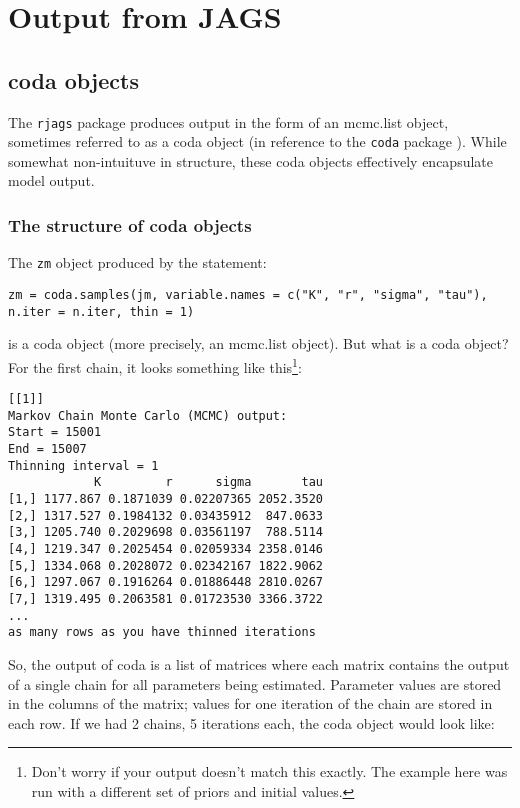 \documentclass[12pt,english]{article}
\begin{document}
\section{Output from JAGS}

\subsection{coda objects}

The \texttt{rjags} package produces output in the form of an mcmc.list object, sometimes referred to as a coda object (in reference to the \texttt{coda} package \citep{Plummer2016coda}). While somewhat non-intuituve in structure, these coda objects effectively encapsulate model output. 



\subsubsection{The structure of coda objects}

The \texttt{zm} object produced by the statement:

\begin{Verbatim}
zm = coda.samples(jm, variable.names = c("K", "r", "sigma", "tau"), 
n.iter = n.iter, thin = 1)
\end{Verbatim}

\noindent is a coda object (more precisely, an mcmc.list object). But what is a coda object? For the first chain, it looks something like this\footnote{Don't worry if your output doesn't match this exactly. The example here was run with a different set of priors and initial values.}:

\begin{Verbatim}[fontsize=\small]
[[1]]
Markov Chain Monte Carlo (MCMC) output:
Start = 15001
End = 15007
Thinning interval = 1
            K         r      sigma       tau
[1,] 1177.867 0.1871039 0.02207365 2052.3520
[2,] 1317.527 0.1984132 0.03435912  847.0633
[3,] 1205.740 0.2029698 0.03561197  788.5114
[4,] 1219.347 0.2025454 0.02059334 2358.0146
[5,] 1334.068 0.2028072 0.02342167 1822.9062
[6,] 1297.067 0.1916264 0.01886448 2810.0267
[7,] 1319.495 0.2063581 0.01723530 3366.3722
...
as many rows as you have thinned iterations
\end{Verbatim}

\noindent So, the output of coda is a list of matrices where each matrix contains the output of a single chain for all parameters being estimated. Parameter values are stored in the columns of the matrix; values for one iteration of the chain are stored in each row. If we had 2 chains, 5 iterations each, the coda object would look like:
\end{document}
